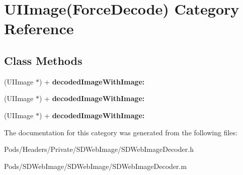 \hypertarget{category_u_i_image_07_force_decode_08}{}\section{U\+I\+Image(Force\+Decode) Category Reference}
\label{category_u_i_image_07_force_decode_08}
\subsection*{Class Methods}
\begin{DoxyCompactItemize}
\item 
\mbox{\label{category_u_i_image_07_force_decode_08_a292c472475a3afae92148fab133138ca}} 
(U\+I\+Image $\ast$) + {\bfseries decoded\+Image\+With\+Image\+:}
\item 
\mbox{\label{category_u_i_image_07_force_decode_08_a292c472475a3afae92148fab133138ca}} 
(U\+I\+Image $\ast$) + {\bfseries decoded\+Image\+With\+Image\+:}
\item 
\mbox{\label{category_u_i_image_07_force_decode_08_a292c472475a3afae92148fab133138ca}} 
(U\+I\+Image $\ast$) + {\bfseries decoded\+Image\+With\+Image\+:}
\end{DoxyCompactItemize}


The documentation for this category was generated from the following files\+:\begin{DoxyCompactItemize}
\item 
Pods/\+Headers/\+Private/\+S\+D\+Web\+Image/S\+D\+Web\+Image\+Decoder.\+h\item 
Pods/\+S\+D\+Web\+Image/\+S\+D\+Web\+Image/S\+D\+Web\+Image\+Decoder.\+m\end{DoxyCompactItemize}
